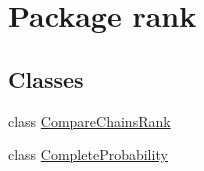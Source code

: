 \hypertarget{namespacerank}{}\section{Package rank}
\label{namespacerank}
\subsection*{Classes}
\begin{DoxyCompactItemize}
\item 
class \hyperlink{classrank_1_1_compare_chains_rank}{Compare\+Chains\+Rank}
\item 
class \hyperlink{classrank_1_1_complete_probability}{Complete\+Probability}
\end{DoxyCompactItemize}
